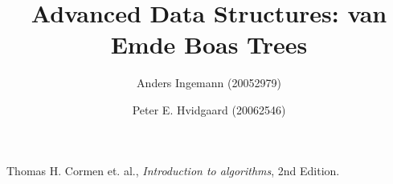 \documentclass[12pt,a4paper]{report}
\title{Advanced Data Structures: van Emde Boas Trees}
\author{Anders Ingemann (20052979) \and Peter E. Hvidgaard (20062546)}
\begin{document}
\maketitle








\pagebreak
\begin{thebibliography}{3}

Thomas H. Cormen et. al.,
\emph{Introduction to algorithms},
2nd Edition.

\end{thebibliography}
\end{document}
